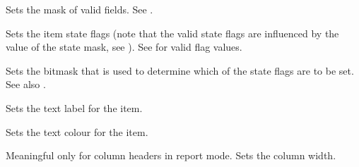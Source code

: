 
Sets the mask of valid fields. See .

\label{wxlistitemsetstate}


Sets the item state flags (note that the valid state flags are influenced
by the value of the state mask, see
).
See  for valid flag
values.

\label{wxlistitemsetstatemask}


Sets the bitmask that is used to determine which of the state flags
are to be set. See also .

\label{wxlistitemsettext}


Sets the text label for the item.

\label{wxlistitemsettextcolour}


Sets the text colour for the item.

\label{wxlistitemsetwidth}


Meaningful only for column headers in report mode. Sets the column width.

